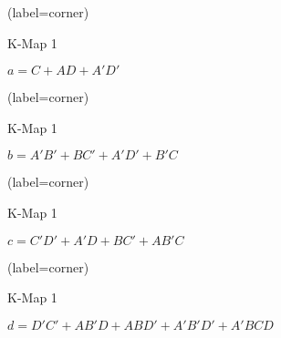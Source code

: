 \begin{enumerate}
	
	
	\begin{latin}
		\begin{minipage}{0.48\textwidth}
			\centering
			\begin{karnaugh-map}[4][4][1][$B$][$A$][$D$][$C$](label=corner)
				
			\end{karnaugh-map}
			\caption{K-Map 1}
			$a=C+AD+A'D'$
		\end{minipage}
		\hfill
		\begin{minipage}{0.48\textwidth}
			\centering
			\begin{karnaugh-map}[4][4][1][$B$][$A$][$D$][$C$](label=corner)
			\end{karnaugh-map}
			\caption{K-Map 1}
			$b=A'B'+BC'+A'D'+B'C$
		\end{minipage}	
	\end{latin}
	
	
	
	
	
	\begin{latin}
		\begin{minipage}{0.48\textwidth}
			\centering
			\begin{karnaugh-map}[4][4][1][$B$][$A$][$D$][$C$](label=corner)
				
			\end{karnaugh-map}
			\caption{K-Map 1}
			$c=C'D'+A'D+BC'+AB'C$
		\end{minipage}
		\hfill
		\begin{minipage}{0.48\textwidth}
			\centering
			\begin{karnaugh-map}[4][4][1][$B$][$A$][$D$][$C$](label=corner)
			\end{karnaugh-map}
			\caption{K-Map 1}
			$d=D'C'+AB'D+ABD'+A'B'D'+A'BCD$
		\end{minipage}	
	\end{latin}
	

\end{enumerate}
